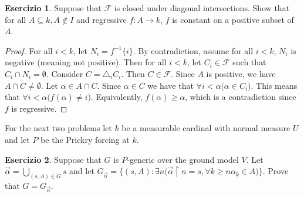 \documentclass[a4paper,12pt]{article}
\theoremstyle{plain}
\theoremstyle{definition}
\newtheorem{esercizio}{Esercizio}
\theoremstyle{remark}
\begin{document}
\begin{esercizio}

	Suppose that $\mathcal{F}$ is closed under diagonal intersections.
	Show that for all $A \subseteq k, A \not \in I$ and regressive $f: A \to k$, $f$ is constant on a positive subset of $A$.

\end{esercizio}

\begin{proof}
	For all $i < k$, let $N_i = f^{-1}\{i\}$. By contradiction, assume for all $i < k$, $N_i$ is negative (meaning not positive).
	Then for all $i < k$, let $C_i \in \mathcal{F}$ such that $C_i \cap N_i = \emptyset$.
	Consider $C = \triangle_i C_i$. Then $C \in \mathcal{F}$. Since $A$ is positive, we have $A \cap C \not = \emptyset$.
	Let $\alpha \in A \cap C$. Since $\alpha \in C$ we have that $\forall i< \alpha \big(\alpha \in C_i \big)$.
	This means that $\forall i<\alpha \big( f(\alpha) \not = i \big)$. Equivalently, $f(\alpha) \geq \alpha$, which is a contradiction
	since $f$ is regressive.

\end{proof}



For the next two problems let $k$ be a measurable cardinal with normal measure $U$ and let $P$ be the Prickry forcing at $k$.

\begin{esercizio}

	Suppose that $G$ is $P$-generic over the ground model $V$.
	Let $\vec{\alpha} = \bigcup_{(s,A) \in G} s$ and let 
	$G_{\vec{\alpha}} = \{(s,A) : \exists n \big( \vec{\alpha} \restriction n = s , \forall k \geq n \alpha_k \in A \big) \}$.
	Prove that $G = G_{\vec{\alpha}}$.

\end{esercizio}
\end{document}
